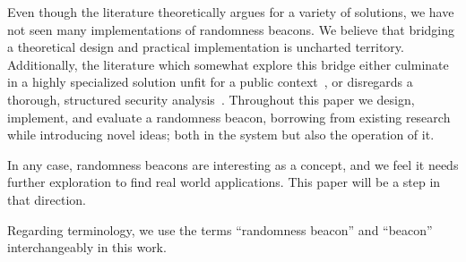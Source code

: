 Even though the literature theoretically argues for a variety of solutions, we have not seen many implementations of randomness beacons.
We believe that bridging a theoretical design and practical implementation is uncharted territory.
Additionally, the literature which somewhat explore this bridge either culminate in a highly specialized solution unfit for a public context~\cite{cascudo2017scrape, syta2017scalable}, or disregards a thorough, structured security analysis~\cite{bunz2017proofsof}.
Throughout this paper we design, implement, and evaluate a randomness beacon, borrowing from existing research while introducing novel ideas; both in the system but also the operation of it.

In any case, randomness beacons are interesting as a concept, and we feel it needs further exploration to find real world applications.
This paper will be a step in that direction.

Regarding terminology, we use the terms \enquote{randomness beacon} and \enquote{beacon} interchangeably in this work.

